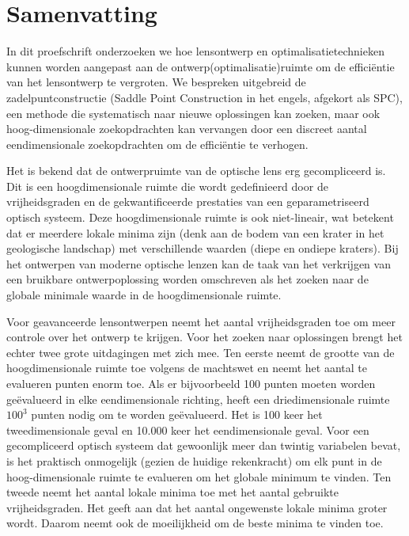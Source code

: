 \chapter*{Samenvatting}
{

\noindent 
In dit proefschrift onderzoeken we hoe lensontwerp en optimalisatietechnieken kunnen worden aangepast aan de ontwerp(optimalisatie)ruimte om de efficiëntie van het lensontwerp te vergroten. We bespreken uitgebreid de zadelpuntconstructie (Saddle Point Construction in het engels, afgekort als SPC), een methode die systematisch naar nieuwe oplossingen kan zoeken, maar ook hoog-dimensionale zoekopdrachten kan vervangen door een discreet aantal eendimensionale zoekopdrachten om de efficiëntie te verhogen.

Het is bekend dat de ontwerpruimte van de optische lens erg gecompliceerd is. Dit is een hoogdimensionale ruimte die wordt gedefinieerd door de vrijheidsgraden en de gekwantificeerde prestaties van een geparametriseerd optisch systeem. Deze hoogdimensionale ruimte is ook niet-lineair, wat betekent dat er meerdere lokale minima zijn (denk aan de bodem van een krater in het geologische landschap) met verschillende waarden (diepe en ondiepe kraters). Bij het ontwerpen van moderne optische lenzen kan de taak van het verkrijgen van een bruikbare ontwerpoplossing worden omschreven als het zoeken naar de globale minimale waarde in de hoogdimensionale ruimte.

Voor geavanceerde lensontwerpen neemt het aantal vrijheidsgraden toe om meer controle over het ontwerp te krijgen. Voor het zoeken naar oplossingen brengt het echter twee grote uitdagingen met zich mee. Ten eerste neemt de grootte van de hoogdimensionale ruimte toe volgens de machtswet en neemt het aantal te evalueren punten enorm toe. Als er bijvoorbeeld 100 punten moeten worden geëvalueerd in elke eendimensionale richting, heeft een driedimensionale ruimte $100^3$ punten nodig om te worden geëvalueerd. Het is 100 keer het tweedimensionale geval en 10.000 keer het eendimensionale geval. Voor een gecompliceerd optisch systeem dat gewoonlijk meer dan twintig variabelen bevat, is het praktisch onmogelijk (gezien de huidige rekenkracht) om elk punt in de hoog-dimensionale ruimte te evalueren om het globale minimum te vinden. Ten tweede neemt het aantal lokale minima toe met het aantal gebruikte vrijheidsgraden. Het geeft aan dat het aantal ongewenste lokale minima groter wordt. Daarom neemt ook de moeilijkheid om de beste minima te vinden toe.

}
